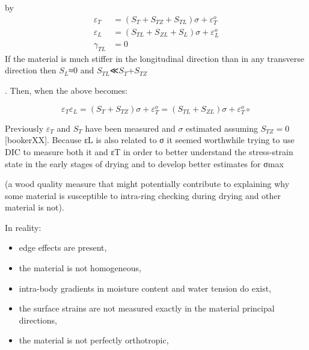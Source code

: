by
\begin {eqnarray}
\varepsilon_T &=(S_T+S_{TZ}+S_{TL}) \sigma +\varepsilon^o_T\\
\varepsilon_L &=(S_{TL}+S_{ZL}+S_L) \sigma +\varepsilon^o_L\\
\gamma_{TL} &=0
\end{eqnarray}
If the material is much stiffer in the longitudinal direction than in any transverse direction then $S_L$≈0
and $S_{TL}$≪$S_T$+$S_{TZ}$

. Then, when the above becomes:

$$\varepsilon_T \varepsilon_L = (S_T+S_{TZ})\sigma + \varepsilon^o_T = \left(S_{TL}+S_{ZL}\right) \sigma + \varepsilon^o_T∘$$

Previously $\varepsilon_T$ and $S_T$ have been measured and $\sigma$ estimated assuming $S_{TZ}=0$ [bookerXX]. Because εL is also related to σ it seemed worthwhile trying to use DIC to measure both it and εT in order to better understand the stress-strain state in the early stages of drying and to develop better estimates for σmax

(a wood quality measure that might potentially contribute to explaining why some material is susceptible to intra-ring checking during drying and other material is not).

In reality:

   \begin{itemize}
\item  edge effects are present,
\end{itemize}
\begin{itemize}
\item     the material is not homogeneous,
\end{itemize}
\begin{itemize}
\item     intra-body gradients in moisture content and water tension do exist,
\end{itemize}
\begin{itemize}
\item     the surface strains are not measured exactly in the material principal directions,
\end{itemize}
\begin{itemize}
\item     the material is not perfectly orthotropic,
\end{itemize}
